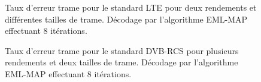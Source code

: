 % 			
% 			
																																																																																																																																								
% 			
% 			

\begin{figure}[h]
	\begin{center}
		\subfloat[LTE R=1/3]{
			
			\label{sub:lte13}
		}	   

		\subfloat[LTE R=4/5]{
			
			\label{sub:lte45}
		}
																																																																																																																																									
		\caption{Taux d'erreur trame pour le standard LTE pour deux rendements et différentes tailles de trame. Décodage 
		par l'algorithme EML-MAP effectuant 8 itérations.}
		\label{fig:ferstdlte}
	\end{center}
\end{figure}

\begin{figure}[h]
	\begin{center}
		\subfloat[DVB-RCS - K=440]{
			
			\label{sub:dvbrcs440}
		}	   

		\subfloat[DVB-RCS - K=752]{
			
			\label{sub:dvbrcs752}
		}
																																																																																																																																									
		\caption{Taux d'erreur trame pour le standard DVB-RCS pour plusieurs rendements et deux tailles de trame. 
		Décodage par l'algorithme EML-MAP effectuant 8 itérations.}
		\label{fig:ferstdDVB1}
	\end{center}
\end{figure}


